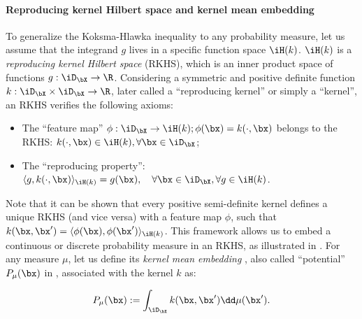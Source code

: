 \paragraph{Reproducing kernel Hilbert space and kernel mean embedding}
To generalize the Koksma-Hlawka inequality to any probability measure, let us assume that the integrand $g$ lives in a specific function space $\iH(k)$. $\iH(k)$ is a \emph{reproducing kernel Hilbert space} (RKHS), which is an inner product space of functions $g:\iD_{\bX} \rightarrow \R$. 
Considering a symmetric and positive definite function $k: \iD_{\bX} \times \iD_{\bX} \rightarrow \R$, later called a ``reproducing kernel'' or simply a ``kernel'', an RKHS verifies the following axioms: 
\begin{itemize}
    \item The ``feature map'' $\phi : \iD_{\bX} \to \iH(k); \phi(\bx) = k(\cdot, \bx)$ belongs to the RKHS: $k(\cdot, \bx) \in \iH(k), \forall \bx \in \iD_{\bX}$;
    \item The ``reproducing property'': $\langle g, k(\cdot, \bx) \rangle_{\iH(k)} = g(\bx), \quad \forall \bx \in \iD_{\bX}, \forall g \in \iH(k)$.
\end{itemize}
Note that it can be shown that every positive semi-definite kernel defines a unique RKHS (and vice versa) with a feature map $\phi$, such that $k(\bx, \bx') = \langle \phi(\bx), \phi(\bx') \rangle_{\iH(k)}$.
This framework allows us to embed a continuous or discrete probability measure in an RKHS, as illustrated in . 
For any measure $\mu$, let us define its \emph{kernel mean embedding} \citep{sejdinovic_2013}, also called ``potential'' $P_{\mu}(\bx)$ in \cite{pronzato_zhigljavsky_2020}, associated with the kernel $k$ as:

\begin{equation}
   P_{\mu}(\bx) := \int_{\iD_{\bX}} k(\bx, \bx') \dd \mu(\bx').
\end{equation}

